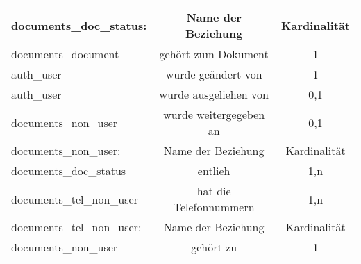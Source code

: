\begin{tabular}[ht]{|l||c|c|}
  documents\_doc\_status: & Name der Beziehung & Kardinalität\\
  \hline\hline
  documents\_document & gehört zum Dokument & 1\\
  \hline
  auth\_user & wurde geändert von & 1\\
  \hline
  auth\_user & wurde ausgeliehen von & 0,1\\
  \hline
  documents\_non\_user & wurde weitergegeben an & 0,1\\
  \hline\hline\hline
  
  documents\_non\_user: & Name der Beziehung & Kardinalität\\
  \hline\hline
  documents\_doc\_status & entlieh & 1,n\\
  \hline
  documents\_tel\_non\_user & hat die Telefonnummern & 1,n\\
  \hline\hline\hline
  
  documents\_tel\_non\_user:  & Name der Beziehung &  Kardinalit\"at\\
  \hline\hline
  documents\_non\_user & gehört zu & 1 \\
  \hline
\end{tabular}

